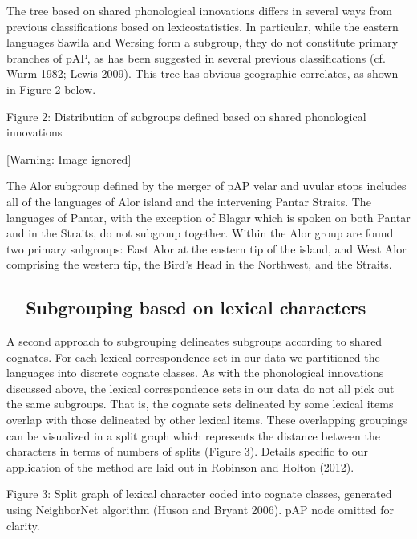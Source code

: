 The tree based on shared phonological innovations differs in several ways from previous classifications based on lexicostatistics. In particular, while the eastern languages Sawila and Wersing form a subgroup, they do not constitute primary branches of pAP, as has been suggested in several previous classifications (cf. Wurm 1982; Lewis 2009). This tree has obvious geographic correlates, as shown in Figure 2 below. 

{\centering
Figure 2: Distribution of subgroups defined based on shared phonological innovations
\par}

  [Warning: Image ignored] %
 

The Alor subgroup defined by the merger of pAP velar and uvular stops includes all of the languages of Alor island and the intervening Pantar Straits. The languages of Pantar, with the exception of Blagar which is spoken on both Pantar and in the Straits, do not subgroup together. Within the Alor group are found two primary subgroups: East Alor at the eastern tip of the island, and West Alor comprising the western tip, the Bird{\textquoteright}s Head in the Northwest, and the Straits.

\subsection[\ \ Subgrouping based on lexical characters]{\ \ Subgrouping based on lexical characters}
\hypertarget{RefHeading49933871885726}{}A second approach to subgrouping delineates subgroups according to shared cognates. For each lexical correspondence set in our data we partitioned the languages into discrete cognate classes. As with the phonological innovations discussed above, the lexical correspondence sets in our data do not all pick out the same subgroups. That is, the cognate sets delineated by some lexical items overlap with those delineated by other lexical items. These overlapping groupings can be visualized in a split graph which represents the distance between the characters in terms of numbers of splits (Figure 3). Details specific to our application of the method are laid out in Robinson and Holton (2012).

{\centering
\label{bkm:Ref317159090}Figure 3: Split graph of lexical character coded into cognate classes, generated using NeighborNet algorithm (Huson and Bryant 2006). pAP node omitted for clarity. 
\par}

